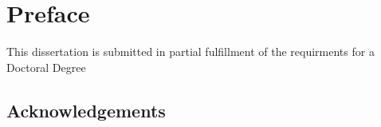 \chapter*{Preface}

This dissertation is submitted in partial fulfillment of the requirments for a Doctoral Degree


\section*{Acknowledgements}


